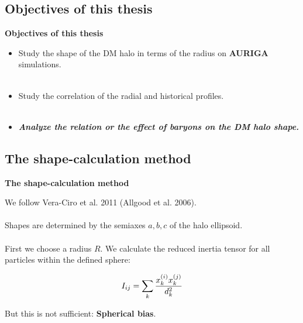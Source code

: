 \documentclass[xcolor=dvipsnames]{beamer}
\begin{document}
\subsection{Objectives of this thesis}
\begin{frame}
\centering
\LARGE
\textbf{Objectives of this thesis}
\normalsize
\end{frame}

\begin{frame}

\begin{itemize}
\item Study the shape of the DM halo in terms of the radius on \textbf{AURIGA} simulations.\\~\\

\item Study the correlation of the radial and historical profiles.\\~\\

\item \textbf{\textit{Analyze the relation or the effect of baryons on the DM halo shape.}}

\end{itemize}

\end{frame}

\subsection{The shape-calculation method}
\begin{frame}
\centering
\LARGE
\textbf{The shape-calculation method}
\normalsize
\end{frame}

\begin{frame}
\footnotesize
We follow Vera-Ciro et al. 2011 (Allgood et al. 2006).\\~\\

Shapes are determined by the semiaxes $a,b,c$ of the halo ellipsoid.\\~\\

First we choose a radius $R$. We calculate the reduced inertia tensor for all particles within the defined sphere:

\begin{equation}
\Large
I_{ij} = \sum_k \frac{x_k^{(i)}x_k^{(j)}}{d^2_k}
\end{equation}

But this is not sufficient: \textbf{Spherical bias}.

\end{frame}
\end{document}
